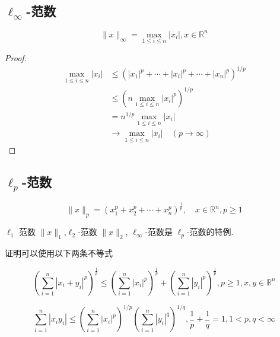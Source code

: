\subsection{$ \ell_{\infty} $-范数}

\begin{definition}
    $$ \|x\|_{\infty}=\max _{1 \leq i \leq n}\left|x_{i}\right|, x \in \mathbb{R}^{n} $$
\end{definition}

\begin{proof}
    $$ \begin{aligned} \max _{1 \leq i \leq n}\left|x_{i}\right| 
        &\leq \left(\left|x_{1}\right|^{p}+\cdots+\left|x_{i}\right|^{p}+\cdots+\left|x_{n}\right|^{p}\right)^{1 / p} \\
        &\leq \left(n \max _{1 \leq i \leq n}\left|x_{i}\right|^{p}\right)^{1 / p}\\
        &  =n^{1 / p} \max _{1 \leq i \leq n}\left|x_{i}\right| \\ &\rightarrow \max _{1 \leq i \leq n}\left|x_{i}\right| \quad(p \rightarrow \infty)\end{aligned}
    $$
\end{proof}

\subsection{$ \ell_{p} $-范数}

\begin{definition}
    $$ \|x\|_{p}=\left(x_{1}^{\mathrm{p}}+x_{2}^{p}+\cdots+x_{n}^{p}\right)^{\frac{1}{p}}, \quad x \in \mathbb{R}^{n}, p \ge 1 $$

    $ \ell_{1} $ 范数 $ \|x\|_{1}$,$ \ell_{2} $-范数 $ \|x\|_{2} $, $ \ell_{\infty} $-范数是 $ \ell_{p} $-范数的特例. 
\end{definition}

证明可以使用以下两条不等式

\begin{theorem}
    $$ \left(\sum_{i=1}^{n}\left|x_{i}+y_{i}\right|^{p}\right)^{\frac{1}{p}} \leq\left(\sum_{i=1}^{n}\left|x_{i}\right|^{p}\right)^{\frac{1}{p}}+\left(\sum_{i=1}^{n}\left|y_{i}\right|^{p}\right)^{\frac{1}{p}}, p \geq 1, x, y \in \mathbb{R}^{n} $$
\end{theorem}

\begin{theorem}
    $$ \sum_{i=1}^{n}\left|x_{i} y_{i}\right| \leq\left(\sum_{i=1}^{n}\left|x_{i}\right|^{p}\right)^{1 / p}\left(\sum_{i=1}^{n}\left|y_{i}\right|^{q}\right)^{1 / q}, \frac{1}{p}+\frac{1}{q}=1,1<p, q<\infty $$
\end{theorem}

